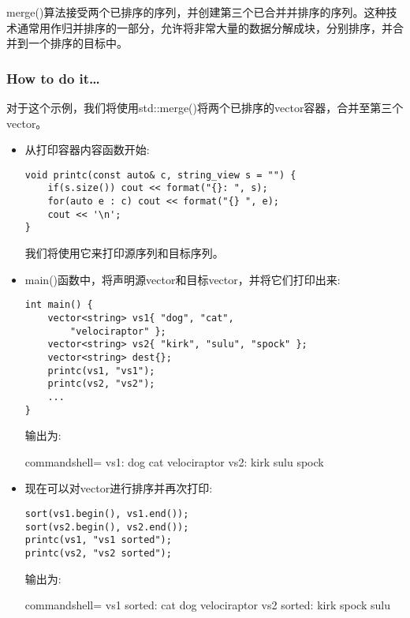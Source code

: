 
merge()算法接受两个已排序的序列，并创建第三个已合并并排序的序列。这种技术通常用作归并排序的一部分，允许将非常大量的数据分解成块，分别排序，并合并到一个排序的目标中。

\subsubsection{How to do it…}

对于这个示例，我们将使用std::merge()将两个已排序的vector容器，合并至第三个vector。

\begin{itemize}
\item 
从打印容器内容函数开始:

\begin{lstlisting}[style=styleCXX]
void printc(const auto& c, string_view s = "") {
	if(s.size()) cout << format("{}: ", s);
	for(auto e : c) cout << format("{} ", e);
	cout << '\n';
}
\end{lstlisting}

我们将使用它来打印源序列和目标序列。

\item 
main()函数中，将声明源vector和目标vector，并将它们打印出来:

\begin{lstlisting}[style=styleCXX]
int main() {
	vector<string> vs1{ "dog", "cat",
		"velociraptor" };
	vector<string> vs2{ "kirk", "sulu", "spock" };
	vector<string> dest{};
	printc(vs1, "vs1");
	printc(vs2, "vs2");
	...
}
\end{lstlisting}

输出为:

\begin{tcblisting}{commandshell={}}
vs1: dog cat velociraptor
vs2: kirk sulu spock
\end{tcblisting}

\item 
现在可以对vector进行排序并再次打印:

\begin{lstlisting}[style=styleCXX]
sort(vs1.begin(), vs1.end());
sort(vs2.begin(), vs2.end());
printc(vs1, "vs1 sorted");
printc(vs2, "vs2 sorted");
\end{lstlisting}

输出为:

\begin{tcblisting}{commandshell={}}
vs1 sorted: cat dog velociraptor
vs2 sorted: kirk spock sulu
\end{tcblisting}


\end{itemize}
